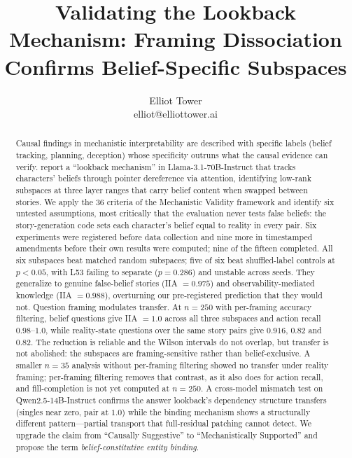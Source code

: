 \documentclass{article}
\title{Validating the Lookback Mechanism: Framing Dissociation Confirms Belief-Specific Subspaces}
\author{\name Elliot Tower \\
      \email elliot@elliottower.ai}
\begin{document}
\maketitle

\begin{abstract}
Causal findings in mechanistic interpretability are described with specific labels (belief tracking, planning, deception) whose specificity outruns what the causal evidence can verify. \citet{prakash2025lookback} report a ``lookback mechanism'' in Llama-3.1-70B-Instruct that tracks characters' beliefs through pointer dereference via attention, identifying low-rank subspaces at three layer ranges that carry belief content when swapped between stories. We apply the 36 criteria of the Mechanistic Validity framework and identify six untested assumptions, most critically that the evaluation never tests false beliefs: the story-generation code sets each character's belief equal to reality in every pair. Six experiments were registered before data collection and nine more in timestamped amendments before their own results were computed; nine of the fifteen completed. All six subspaces beat matched random subspaces; five of six beat shuffled-label controls at $p < 0.05$, with L53 failing to separate ($p = 0.286$) and unstable across seeds. They generalize to genuine false-belief stories (IIA $= 0.975$) and observability-mediated knowledge (IIA $= 0.988$), overturning our pre-registered prediction that they would not. Question framing modulates transfer. At $n = 250$ with per-framing accuracy filtering, belief questions give IIA $= 1.0$ across all three subspaces and action recall $0.98$--$1.0$, while reality-state questions over the same story pairs give $0.916$, $0.82$ and $0.82$. The reduction is reliable and the Wilson intervals do not overlap, but transfer is not abolished: the subspaces are framing-sensitive rather than belief-exclusive. A smaller $n = 35$ analysis without per-framing filtering showed no transfer under reality framing; per-framing filtering removes that contrast, as it also does for action recall, and fill-completion is not yet computed at $n = 250$. A cross-model mismatch test on Qwen2.5-14B-Instruct confirms the answer lookback's dependency structure transfers (singles near zero, pair at $1.0$) while the binding mechanism shows a structurally different pattern---partial transport that full-residual patching cannot detect. We upgrade the claim from ``Causally Suggestive'' to ``Mechanistically Supported'' and propose the term \emph{belief-constitutive entity binding}.
\end{abstract}
\end{document}
